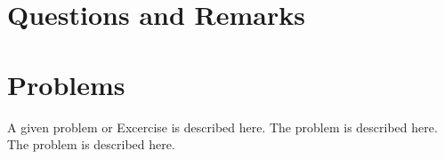 \section{Questions and Remarks}
\label{sec:QR3}






%
%
%


\section*{Problems}
%
\begin{prob}
\label{prob1}
A given problem or Excercise is described here. The
problem is described here. The problem is described here.
\end{prob}



